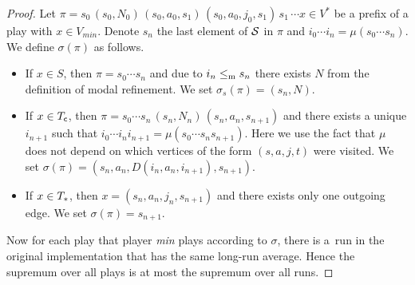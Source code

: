\begin{proof}
Let $\pi=s_0\, (s_0,N_0)\, (s_0,a_0,s_1)\, (s_0,a_0,j_0,s_1)\, s_1\, \cdots x\in V^*$ be a prefix of a play with $x\in V_{min}$. Denote $s_n$ the last element of $\mathcal S$ in $\pi$ and $i_0\cdots i_n=\mu(s_0\cdots s_n)$.
We define $\sigma(\pi)$ as follows.
\begin{itemize}
\item If $x\in S$, then $\pi=s_0\cdots s_n$ and due to $i_n\le_\mathrm m s_n$ there exists $N$ from the definition of modal refinement. We set $\sigma_s(\pi) = (s_n,N)$.
\item If $x\in T_\mathsf c$, then $\pi=s_0\cdots s_n\, (s_n,N_n)\,(s_n,a_n,s_{n+1})$ and there exists a unique $i_{n+1}$ such that $i_0\cdots i_ni_{n+1}=\mu(s_0\cdots s_n s_{n+1})$. Here we use the fact that $\mu$ does not depend on which vertices of the form $(s,a,j,t)$ were visited. We set $\sigma(\pi) = (s_n,a_n,D(i_n,a_n,i_{n+1}),s_{n+1})$. 
\item If $x\in T_*$, then $x=(s_n,a_n,j_n,s_{n+1})$ and there exists only one outgoing edge. We set $\sigma(\pi)=s_{n+1}$.
\end{itemize}
Now for each play that player \emph{min} plays according
to $\sigma$, there is a~run in the original implementation that has the same long-run average.
Hence the supremum over all plays is at most the supremum over all runs. %
\end{proof}

